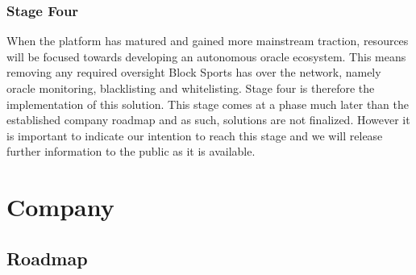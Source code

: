 \documentclass{article}
\begin{document}
		\subsubsection{Stage Four}
		When the platform has matured and gained more mainstream traction, resources will be focused towards developing an autonomous oracle ecosystem. This means removing any required oversight Block Sports has over the network, namely oracle monitoring, blacklisting and whitelisting. Stage four is therefore the implementation of this solution. This stage comes at a phase much later than the established company roadmap and as such, solutions are not finalized. However it is important to indicate our intention to reach this stage and we will release further information to the public as it is available.

\section{Company}
	\subsection{Roadmap}
\end{document}
